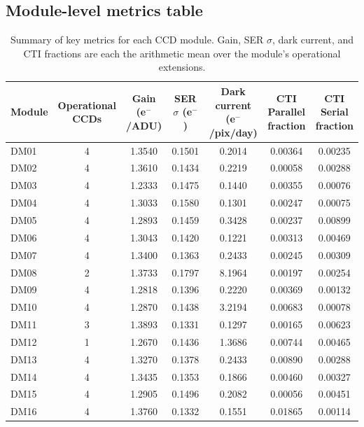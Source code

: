 \documentclass[11pt]{article}
\begin{document}
\subsection{Module-level metrics table}
\begin{table}[H]
\centering
\caption{Summary of key metrics for each CCD module. Gain, SER $\sigma$, dark current, and CTI fractions are each the arithmetic mean over the module's operational extensions.}
\label{tab:summary_metrics}
\renewcommand{\arraystretch}{1.2}
\begin{tabular}{@{}lcccccc@{}}
\toprule
Module
& \makecell{Operational \\ CCDs}
& \makecell{Gain \\ (e$^{-}$/ADU)}
& \makecell{SER $\sigma$ \\ (e$^{-}$)}
& \makecell{Dark current \\ (e$^{-}$/pix/day)}
& \makecell{CTI \\ Parallel fraction}
& \makecell{CTI \\ Serial fraction} \\
\midrule
DM01 & 4 & 1.3540 & 0.1501 & 0.2014 & 0.00364 & 0.00235 \\
DM02 & 4 & 1.3610 & 0.1434 & 0.2219 & 0.00058 & 0.00288 \\
DM03 & 4 & 1.2333 & 0.1475 & 0.1440 & 0.00355 & 0.00076 \\
DM04 & 4 & 1.3033 & 0.1580 & 0.1301 & 0.00247 & 0.00075 \\
DM05 & 4 & 1.2893 & 0.1459 & 0.3428 & 0.00237 & 0.00899 \\
DM06 & 4 & 1.3043 & 0.1420 & 0.1221 & 0.00313 & 0.00469 \\
DM07 & 4 & 1.3400 & 0.1363 & 0.2433 & 0.00245 & 0.00309 \\
DM08 & 2 & 1.3733 & 0.1797 & 8.1964 & 0.00197 & 0.00254 \\
DM09 & 4 & 1.2818 & 0.1396 & 0.2220 & 0.00369 & 0.00132 \\
DM10 & 4 & 1.2870 & 0.1438 & 3.2194 & 0.00683 & 0.00078 \\
DM11 & 3 & 1.3893 & 0.1331 & 0.1297 & 0.00165 & 0.00623 \\
DM12 & 1 & 1.2670 & 0.1436 & 1.3686 & 0.00744 & 0.00465 \\
DM13 & 4 & 1.3270 & 0.1378 & 0.2433 & 0.00890 & 0.00288 \\
DM14 & 4 & 1.3435 & 0.1353 & 0.1866 & 0.00460 & 0.00327 \\
DM15 & 4 & 1.2905 & 0.1496 & 0.2082 & 0.00056 & 0.00451 \\
DM16 & 4 & 1.3760 & 0.1332 & 0.1551 & 0.01865 & 0.00114 \\

\end{tabular}
\end{table}
\end{document}
